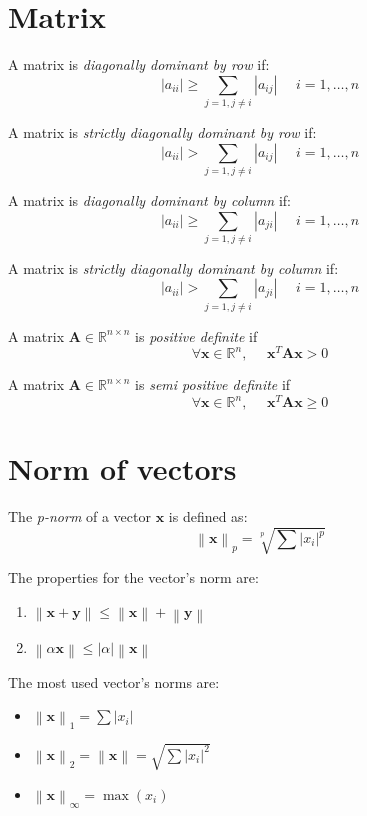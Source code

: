 \documentclass[12pt, a4paper]{report}
\begin{document}
    \section{Matrix}
    \begin{definition}
        A matrix is \emph{diagonally dominant by row} if: 
        \[\left\lvert a_{ii} \right\rvert \geq \sum_{j=1,j \neq i}{\left\lvert a_{ij} \right\rvert} \:\:\:\:\:\: i=1,\dots,n\]

        A matrix is \emph{strictly diagonally dominant by row} if: 
        \[\left\lvert a_{ii} \right\rvert > \sum_{j=1,j \neq i}{\left\lvert a_{ij} \right\rvert} \:\:\:\:\:\: i=1,\dots,n\]

        A matrix is \emph{diagonally dominant by column} if: 
        \[\left\lvert a_{ii} \right\rvert \geq \sum_{j=1,j \neq i}{\left\lvert a_{ji} \right\rvert} \:\:\:\:\:\: i=1,\dots,n \]

        A matrix is \emph{strictly diagonally dominant by column} if: 
        \[\left\lvert a_{ii} \right\rvert > \sum_{j=1,j \neq i}{\left\lvert a_{ji} \right\rvert} \:\:\:\:\:\: i=1,\dots,n \]

        A matrix $\boldsymbol{A} \in \mathbb{R}^{n \times n}$ is \emph{positive definite} if 
        \[\forall\boldsymbol{x} \in \mathbb{R}^{n}, \:\:\:\:\:\: \boldsymbol{x}^T \boldsymbol{Ax}>0\]

        A matrix $\boldsymbol{A} \in \mathbb{R}^{n \times n}$ is \emph{semi positive definite} if 
        \[\forall\boldsymbol{x} \in \mathbb{R}^{n}, \:\:\:\:\:\: \boldsymbol{x}^T \boldsymbol{Ax} \geq 0\]
    \end{definition}

    \section{Norm of vectors}
    \begin{definition}
        The \emph{p-norm} of a vector $\boldsymbol{x}$ is defined as: 
        \[\left\lVert \boldsymbol{x} \right\rVert_p=\sqrt[p]{\sum{\left\lvert x_i \right\rvert^p }}\]
    \end{definition}
    The properties for the vector's norm are: 
    \begin{enumerate}
        \item $\left\lVert \boldsymbol{x}+\boldsymbol{y} \right\rVert \leq \left\lVert \boldsymbol{x} \right\rVert + \left\lVert \boldsymbol{y} \right\rVert$
        \item $\left\lVert \alpha \boldsymbol{x} \right\rVert \leq \left\lvert \alpha \right\rvert \left\lVert \boldsymbol{x} \right\rVert$
    \end{enumerate}
    The most used vector's norms are: 
    \begin{itemize}
        \item $\left\lVert \boldsymbol{x} \right\rVert_1=\sum{\left\lvert x_i \right\rvert}$
        \item $\left\lVert \boldsymbol{x} \right\rVert_2=\left\lVert \boldsymbol{x} \right\rVert=\sqrt{\sum{\left\lvert x_i \right\rvert^2}}$
        \item $\left\lVert \boldsymbol{x} \right\rVert_{\infty}=\max{\left(x_i\right)}$
    \end{itemize}
\end{document}
